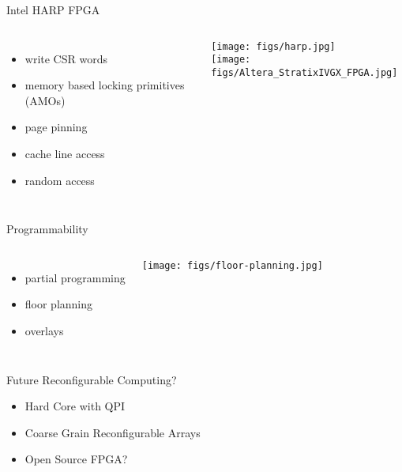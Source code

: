 \begin{frame}[fragile]{Intel HARP FPGA}
\begin{columns}
\begin{itemize}
\item write CSR words
\item memory based locking primitives (AMOs)
\item page pinning
\item cache line access
\item random access
\end{itemize}
\begin{center}
\texttt{[image: figs/harp.jpg]} \\
\texttt{[image: figs/Altera\_StratixIVGX\_FPGA.jpg]} 
\end{center}
\end{columns}
\end{frame}

\begin{frame}[fragile]{Programmability}

\begin{columns}
\begin{itemize}
\item partial programming
\item floor planning
\item overlays
\end{itemize}
\begin{center}
\texttt{[image: figs/floor-planning.jpg]}
\end{center}
\end{columns}

\end{frame}


\begin{frame}[fragile]{Future Reconfigurable Computing?}

\begin{itemize}
\item Hard Core with QPI
\item Coarse Grain Reconfigurable Arrays
\item Open Source FPGA?
\end{itemize}

\end{frame}

% 
